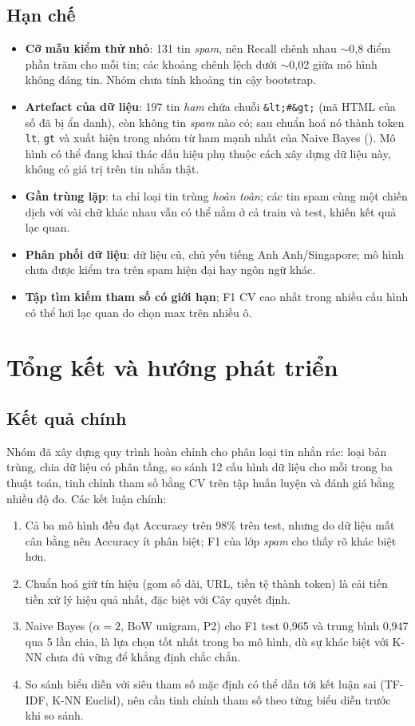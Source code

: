 \documentclass[12pt,a4paper]{article}
\newcommand{\spam}{\textit{spam}}
\newcommand{\ham}{\textit{ham}}
\begin{document}
\subsection{Hạn chế}
\begin{itemize}[nosep]
\item \textbf{Cỡ mẫu kiểm thử nhỏ}: 131 tin \spam, nên Recall chênh nhau $\sim$0,8 điểm phần trăm cho mỗi tin; các khoảng chênh lệch dưới $\sim$0,02 giữa mô hình không đáng tin. Nhóm chưa tính khoảng tin cậy bootstrap.
\item \textbf{Artefact của dữ liệu}: 197 tin \ham{} chứa chuỗi \texttt{\&lt;\#\&gt;} (mã HTML của số đã bị ẩn danh), còn không tin \spam{} nào có; sau chuẩn hoá nó thành token \texttt{lt}, \texttt{gt} và xuất hiện trong nhóm từ ham mạnh nhất của Naive Bayes (\NBtopham). Mô hình có thể đang khai thác dấu hiệu phụ thuộc cách xây dựng dữ liệu này, không có giá trị trên tin nhắn thật.
\item \textbf{Gần trùng lặp}: ta chỉ loại tin trùng \emph{hoàn toàn}; các tin spam cùng một chiến dịch với vài chữ khác nhau vẫn có thể nằm ở cả train và test, khiến kết quả lạc quan.
\item \textbf{Phân phối dữ liệu}: dữ liệu cũ, chủ yếu tiếng Anh Anh/Singapore; mô hình chưa được kiểm tra trên spam hiện đại hay ngôn ngữ khác.
\item \textbf{Tập tìm kiếm tham số có giới hạn}; F1 CV cao nhất trong nhiều cấu hình có thể hơi lạc quan do chọn max trên nhiều ô.
\end{itemize}

\section{Tổng kết và hướng phát triển}
\subsection{Kết quả chính}
Nhóm đã xây dựng quy trình hoàn chỉnh cho phân loại tin nhắn rác: loại bản trùng, chia dữ liệu có phân tầng, so sánh 12 cấu hình dữ liệu cho mỗi trong ba thuật toán, tinh chỉnh tham số bằng CV trên tập huấn luyện và đánh giá bằng nhiều độ đo. Các kết luận chính:
\begin{enumerate}[nosep]
\item Cả ba mô hình đều đạt Accuracy trên 98\% trên test, nhưng do dữ liệu mất cân bằng nên Accuracy ít phân biệt; F1 của lớp \spam{} cho thấy rõ khác biệt hơn.
\item Chuẩn hoá giữ tín hiệu (gom số dài, URL, tiền tệ thành token) là cải tiến tiền xử lý hiệu quả nhất, đặc biệt với Cây quyết định.
\item Naive Bayes ($\alpha=2$, BoW unigram, P2) cho F1 test 0,965 và trung bình 0,947 qua 5 lần chia, là lựa chọn tốt nhất trong ba mô hình, dù sự khác biệt với K-NN chưa đủ vững để khẳng định chắc chắn.
\item So sánh biểu diễn với siêu tham số mặc định có thể dẫn tới kết luận sai (TF-IDF, K-NN Euclid), nên cần tinh chỉnh tham số theo từng biểu diễn trước khi so sánh.
\end{enumerate}
\end{document}

